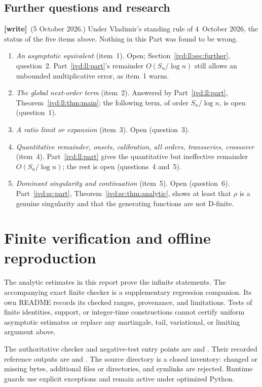 \documentclass[11pt,letterpaper]{article}
\theoremstyle{remark}\newtheorem{remark}[theorem]{Remark}
\numberwithin{equation}{section}
\newcommand{\wtag}{\textup{\textbf{[write]}}}
\begin{document}
\subsection{Further questions and research}\label{ivd:sh:sub:further}
\wtag\ (5 October 2026.) Under Vladimir's standing rule of 4~October 2026, the status of the five items above. Nothing in this Part was found to be wrong.
\begin{enumerate}
\item \emph{An asymptotic equivalent} (item~1). Open; Section~\ref{ivd:ll:sec:further}, question~2. Part~\ref{ivd:ll:part}'s remainder $O(S_n/\log n)$ still allows an unbounded multiplicative error, as item~1 warns.
\item \emph{The global next-order term} (item~2). Answered by Part~\ref{ivd:ll:part}, Theorem~\ref{ivd:ll:thm:main}; the following term, of order $S_n/\log n$, is open (question~1).
\item \emph{A ratio limit or expansion} (item~3). Open (question~3).
\item \emph{Quantitative remainder, onsets, calibration, all orders, transseries, crossover} (item~4). Part~\ref{ivd:ll:part} gives the quantitative but ineffective remainder $O(S_n/\log n)$; the rest is open (questions~4 and~5).
\item \emph{Dominant singularity and continuation} (item~5). Open (question~6). Part~\ref{ivd:sc:part}, Theorem~\ref{ivd:sc:thm:analytic}, shows at least that $\rho$ is a genuine singularity and that the generating functions are not D-finite.
\end{enumerate}

\section{Finite verification and offline reproduction}\label{ivd:sh:sec:verification}
The analytic estimates in this report prove the infinite statements.
The accompanying exact finite checker is a supplementary regression
companion. Its own README records its checked ranges, provenance, and
limitations. Tests of finite identities, support, or integer-time
constructions cannot certify uniform asymptotic estimates or replace
any martingale, tail, variational, or limiting argument above.

The authoritative checker and negative-test entry points are
 and .
Their recorded reference outputs are
 and
. The source directory is a closed
inventory: changed or missing bytes, additional files or directories,
and symlinks are rejected. Runtime guards use explicit exceptions and
remain active under optimized Python.
\end{document}
